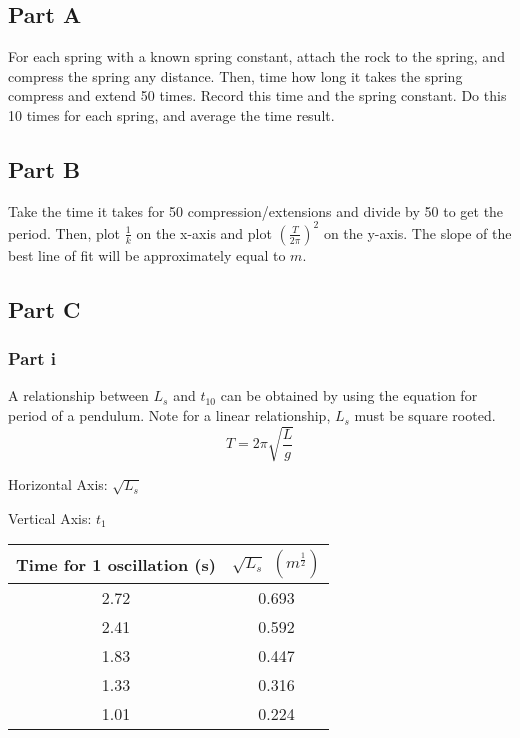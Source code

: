 \documentclass{article}
\begin{document}
\subsection {Part A}

For each spring with a known spring constant, attach the rock to the spring, and compress the spring any distance. Then, time how long it takes the spring compress and extend 50 times. Record this time and the spring constant. Do this 10 times for each spring, and average the time result.

\subsection {Part B}

Take the time it takes for 50 compression/extensions and divide by 50 to get the period. Then, plot $\frac{1}{k}$ on the x-axis and plot $(\frac{T}{2\pi})^2$ on the y-axis. The slope of the best line of fit will be approximately equal to $m$.

\subsection {Part C}

\subsubsection {Part i}

A relationship between $L_s$ and $t_{10}$ can be obtained by using the equation for period of a pendulum. Note for a linear relationship, $L_s$ must be square rooted.
$$
T = 2\pi\sqrt{\frac{L}{g}}
$$

Horizontal Axis: $\sqrt{L_s}$

Vertical Axis: $t_1$

\begin{center}
  \begin{tabular}{|c|c|}
    \hline
    Time for 1 oscillation (s) & $\sqrt{L_s}$ $(m^\frac{1}{2})$\\
    \hline
    2.72 & 0.693 \\
    \hline
    2.41 & 0.592 \\
    \hline
    1.83 & 0.447 \\
    \hline
    1.33 & 0.316 \\
    \hline
    1.01 & 0.224 \\
    \hline
  \end{tabular}
\end{center}
\end{document}
